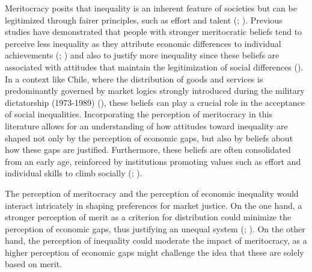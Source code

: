 \documentclass[
  12pt,
]{article}
\begin{document}
Meritocracy posits that inequality is an inherent feature of societies
but can be legitimized through fairer principles, such as effort and
talent (;
). Previous studies have
demonstrated that people with stronger meritocratic beliefs tend to
perceive less inequality as they attribute economic differences to
individual achievements (;
) and also to justify more
inequality since these beliefs are associated with attitudes that
maintain the legitimization of social differences
(). In a context
like Chile, where the distribution of goods and services is
predominantly governed by market logics strongly introduced during the
military dictatorship (1973-1989)
(), these beliefs can
play a crucial role in the acceptance of social inequalities.
Incorporating the perception of meritocracy in this literature allows
for an understanding of how attitudes toward inequality are shaped not
only by the perception of economic gaps, but also by beliefs about how
these gaps are justified. Furthermore, these beliefs are often
consolidated from an early age, reinforced by institutions promoting
values such as effort and individual skills to climb socially
(;
).

The perception of meritocracy and the perception of economic inequality
would interact intricately in shaping preferences for market justice. On
the one hand, a stronger perception of merit as a criterion for
distribution could minimize the perception of economic gaps, thus
justifying an unequal system
(;
). On the other hand, the
perception of inequality could moderate the impact of meritocracy, as a
higher perception of economic gaps might challenge the idea that these
are solely based on merit.
\end{document}
